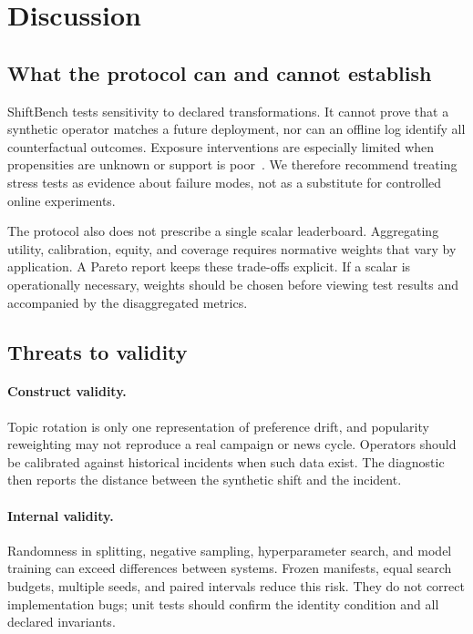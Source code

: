 \section{Discussion}
\label{sec:discussion}

\subsection{What the protocol can and cannot establish}

ShiftBench tests sensitivity to declared transformations.  It cannot prove that
a synthetic operator matches a future deployment, nor can an offline log identify
all counterfactual outcomes.  Exposure interventions are especially limited when
propensities are unknown or support is poor~\cite{Schnabel2016,Saito2020}.  We
therefore recommend treating stress tests as evidence about failure modes, not as
a substitute for controlled online experiments.

The protocol also does not prescribe a single scalar leaderboard.  Aggregating
utility, calibration, equity, and coverage requires normative weights that vary
by application.  A Pareto report keeps these trade-offs explicit.  If a scalar
is operationally necessary, weights should be chosen before viewing test results
and accompanied by the disaggregated metrics.

\subsection{Threats to validity}

\paragraph{Construct validity.}
Topic rotation is only one representation of preference drift, and popularity
reweighting may not reproduce a real campaign or news cycle.  Operators should be
calibrated against historical incidents when such data exist.  The diagnostic
then reports the distance between the synthetic shift and the incident.

\paragraph{Internal validity.}
Randomness in splitting, negative sampling, hyperparameter search, and model
training can exceed differences between systems.  Frozen manifests, equal search
budgets, multiple seeds, and paired intervals reduce this risk.  They do not
correct implementation bugs; unit tests should confirm the identity condition
and all declared invariants.

